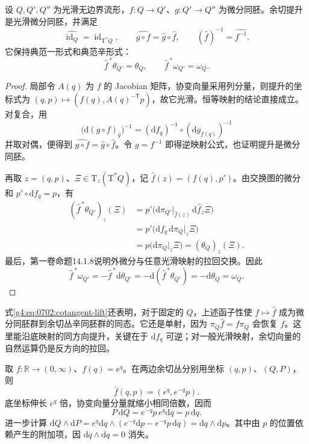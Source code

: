 \begin{proposition}
	\label{g4:prop:0702:cotangent-lift}
	设 \(Q,Q',Q''\) 为光滑无边界流形，\(f:Q\to Q'\)、\(g:Q'\to Q''\) 为微分同胚。余切提升是光滑微分同胚，并满足
	\[
		\widehat{\operatorname{id}_Q}=\operatorname{id}_{\mathrm{T}^*Q},
		\qquad
		\widehat{g\circ f}=\widehat g\circ\widehat f,
		\qquad
		(\widehat f)^{-1}=\widehat{f^{-1}}.
	\]
	它保持典范一形式和典范辛形式：
	\[
		\widehat f^{\,*}\theta_{Q'}=\theta_Q,
		\qquad
		\widehat f^{\,*}\omega_{Q'}=\omega_Q.
	\]
\end{proposition}
\begin{proof}
	局部令 \(A(q)\) 为 \(f\) 的 Jacobian 矩阵，协变向量采用列分量，则提升的坐标式为 \((q,p)\mapsto(f(q),A(q)^{-\mathsf T}p)\)，故它光滑。恒等映射的结论直接成立。对复合，用
	\[
		\bigl(\mathrm{d}(g\circ f)_q\bigr)^{-1}
		=(\mathrm{d}f_q)^{-1}\circ(\mathrm{d}g_{f(q)})^{-1}
	\]
	并取对偶，便得到 \(\widehat{g\circ f}=\widehat g\circ\widehat f\)。令 \(g=f^{-1}\) 即得逆映射公式，也证明提升是微分同胚。

	再取 \(z=(q,p)\)、\(\Xi\in\mathrm{T}_z(\mathrm{T}^*Q)\)，记 \(\widehat f(z)=(f(q),p')\)。由交换图的微分和 \(p'\circ\mathrm{d}f_q=p\)，有
	\[
		\begin{aligned}
			(\widehat f^{\,*}\theta_{Q'})_z(\Xi)
			&=p'\bigl(\mathrm{d}\pi_{Q'}|_{\widehat f(z)}
				\,\mathrm{d}\widehat f_z\Xi\bigr)\\
			&=p'\bigl(\mathrm{d}f_q\,\mathrm{d}\pi_Q|_z\Xi\bigr)\\
			&=p\bigl(\mathrm{d}\pi_Q|_z\Xi\bigr)
			=(\theta_Q)_z(\Xi).
		\end{aligned}
	\]
	最后，第一卷命题14.1.8说明外微分与任意光滑映射的拉回交换。因此
	\[
		\widehat f^{\,*}\omega_{Q'}
		=-\widehat f^{\,*}\mathrm{d}\theta_{Q'}
		=-\mathrm{d}(\widehat f^{\,*}\theta_{Q'})
		=-\mathrm{d}\theta_Q=\omega_Q.
	\]
\end{proof}

式\eqref{g4:eq:0702:cotangent-lift}还表明，对于固定的 \(Q\)，上述函子性使 \(f\mapsto\widehat f\) 成为微分同胚群到余切丛辛同胚群的同态。它还是单射，因为 \(\pi_Q\widehat f=f\pi_Q\) 会恢复 \(f\)。这里能沿底映射的同方向提升，关键在于 \(\mathrm{d}f_q\) 可逆；对一般光滑映射，余切向量的自然运算仍是反方向的拉回。

\begin{example}
	\label{g4:exm:0702:exponential-lift}
	取 \(f:\mathbb R\to(0,\infty)\)、\(f(q)=e^q\)。在两边余切丛分别用坐标 \((q,p)\)、\((Q,P)\)，则
	\[
		\widehat f(q,p)=(e^q,e^{-q}p).
	\]
	底坐标伸长 \(e^q\) 倍，协变向量分量就缩小相同倍数，因而
	\[
		P\,\mathrm{d}Q=e^{-q}p\,e^q\mathrm{d}q=p\,\mathrm{d}q.
	\]
	进一步计算 \(\mathrm{d}Q\wedge\mathrm{d}P
	=e^q\mathrm{d}q\wedge(e^{-q}\mathrm{d}p-e^{-q}p\,\mathrm{d}q)
	=\mathrm{d}q\wedge\mathrm{d}p\)。其中由 \(p\) 的位置依赖产生的附加项，因 \(\mathrm{d}q\wedge\mathrm{d}q=0\) 消失。
\end{example}

